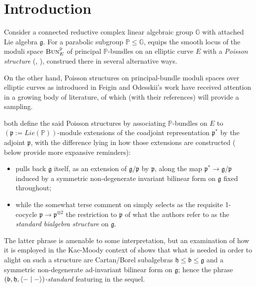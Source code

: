 \documentclass[11pt,leqno]{article}
\theoremstyle{plain}
\theoremstyle{plain}
\theoremstyle{plain}
\numberwithin{equation}{section}
\theoremstyle{nonumberplain}
\newcommand\bG{{\mathbb G}}
\newcommand\bP{{\mathbb P}}
\newcommand\fb{{\mathfrak b}}
\newcommand\fg{{\mathfrak g}}
\newcommand\fh{{\mathfrak h}}
\newcommand\fp{{\mathfrak p}}
\newcommand\1{{\bf 1}}
\newcommand{\cat}[1]{\textsc{#1}}
\begin{document}


\section*{Introduction}

Consider a connected reductive complex linear algebraic group $\bG$ with attached Lie algebra $\fg$. For a parabolic subgroup $\bP\le \bG$, \cite[\S 3]{MR2396472} equips the smooth locus of the moduli space $\cat{Bun}_E^{\bP}$ of principal $\bP$-bundles on an elliptic curve $E$ with a \emph{Poisson structure} (\cite[\S 1.2.1, Definition 1.5]{lgpv_poiss_2013}, \cite[Definition 2.7]{cfm_lec-poiss_2021}), construed there in several alternative ways.

On the other hand, Poisson structures on principal-bundle moduli spaces over elliptic curves as introduced in Feigin and Odesskii's work \cite{FO98} have received attention in a growing body of literature, of which \cite{MR5018405,MR4956460,MR5014131,HP1,hua2023elliptic,MR4855099,MR4214399} (with their references) will provide a sampling. 

\cite{MR2396472,FO98} both define the said Poisson structures by associating $\bP$-bundles on $E$ to $(\fp:=Lie(\bP))$-module extensions of the coadjoint representation $\fp^*$ by the adjoint $\fp$, with the difference lying in how those extensions are constructed ( below provide more expansive reminders):
\begin{itemize}[wide]
\item \cite[(3.2)]{MR2396472} pulls back $\fg$ itself, as an extension of $\fg/\fp$ by $\fp$, along the map $\fp^*\to \fg/\fp$ induced by a symmetric non-degenerate invariant bilinear form on $\fg$ fixed throughout; 

\item while the somewhat terse comment on \cite[p.67]{FO98} simply selects as the requisite 1-cocycle $\fp\to \fp^{\otimes 2}$ the restriction to $\fp$ of what the authors refer to as the \emph{standard bialgebra structure} on $\fg$. 
\end{itemize}
The latter phrase is amenable to some interpretation, but an examination of how it is employed in the Kac-Moody context of \cite[Example 1.3.8]{cp_qg} shows that what is needed in order to alight on such a structure are Cartan/Borel subalgebras $\fh\le \fb\le \fg$ and a symmetric non-degenerate ad-invariant bilinear form on $\fg$; hence the phrase \emph{$(\fb,\fh,\Braket{-\mid-})$-standard} featuring in the sequel. 
\end{document}
